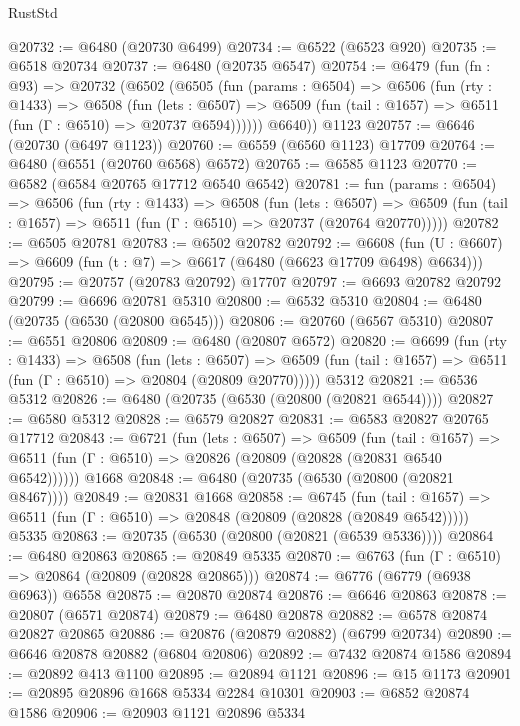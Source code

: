 \begin{lexlean}{RustStd}
\begin{coremodule}
@20732 := @6480 (@20730 @6499)
@20734 := @6522 (@6523 @920)
@20735 := @6518 @20734
@20737 := @6480 (@20735 @6547)
@20754 := @6479
    (fun (fn : @93) =>
    @20732
      (@6502
        (@6505
          (fun (params : @6504) =>
          @6506
            (fun (rty : @1433) =>
            @6508
              (fun (lets : @6507) =>
              @6509 (fun (tail : @1657) => @6511 (fun (Γ : @6510) => @20737 @6594))))))
        @6640))
    @1123
@20757 := @6646 (@20730 (@6497 @1123))
@20760 := @6559 (@6560 @1123) @17709
@20764 := @6480 (@6551 (@20760 @6568) @6572)
@20765 := @6585 @1123
@20770 := @6582 (@6584 @20765 @17712 @6540 @6542)
@20781 := fun (params : @6504) =>
  @6506
    (fun (rty : @1433) =>
    @6508
      (fun (lets : @6507) =>
      @6509 (fun (tail : @1657) => @6511 (fun (Γ : @6510) => @20737 (@20764 @20770)))))
@20782 := @6505 @20781
@20783 := @6502 @20782
@20792 := @6608
    (fun (U : @6607) => @6609 (fun (t : @7) => @6617 (@6480 (@6623 @17709 @6498) @6634)))
@20795 := @20757 (@20783 @20792) @17707
@20797 := @6693 @20782 @20792
@20799 := @6696 @20781 @5310
@20800 := @6532 @5310
@20804 := @6480 (@20735 (@6530 (@20800 @6545)))
@20806 := @20760 (@6567 @5310)
@20807 := @6551 @20806
@20809 := @6480 (@20807 @6572)
@20820 := @6699
    (fun (rty : @1433) =>
    @6508
      (fun (lets : @6507) =>
      @6509 (fun (tail : @1657) => @6511 (fun (Γ : @6510) => @20804 (@20809 @20770)))))
    @5312
@20821 := @6536 @5312
@20826 := @6480 (@20735 (@6530 (@20800 (@20821 @6544))))
@20827 := @6580 @5312
@20828 := @6579 @20827
@20831 := @6583 @20827 @20765 @17712
@20843 := @6721
    (fun (lets : @6507) =>
    @6509
      (fun (tail : @1657) =>
      @6511 (fun (Γ : @6510) => @20826 (@20809 (@20828 (@20831 @6540 @6542))))))
    @1668
@20848 := @6480 (@20735 (@6530 (@20800 (@20821 @8467))))
@20849 := @20831 @1668
@20858 := @6745
    (fun (tail : @1657) => @6511 (fun (Γ : @6510) => @20848 (@20809 (@20828 (@20849 @6542)))))
    @5335
@20863 := @20735 (@6530 (@20800 (@20821 (@6539 @5336))))
@20864 := @6480 @20863
@20865 := @20849 @5335
@20870 := @6763 (fun (Γ : @6510) => @20864 (@20809 (@20828 @20865)))
@20874 := @6776 (@6779 (@6938 @6963)) @6558
@20875 := @20870 @20874
@20876 := @6646 @20863
@20878 := @20807 (@6571 @20874)
@20879 := @6480 @20878
@20882 := @6578 @20874 @20827 @20865
@20886 := @20876 (@20879 @20882) (@6799 @20734)
@20890 := @6646 @20878 @20882 (@6804 @20806)
@20892 := @7432 @20874 @1586
@20894 := @20892 @413 @1100
@20895 := @20894 @1121
@20896 := @15 @1173
@20901 := @20895 @20896 @1668 @5334 @2284 @10301
@20903 := @6852 @20874 @1586
@20906 := @20903 @1121 @20896 @5334

\end{coremodule}
\end{lexlean}
